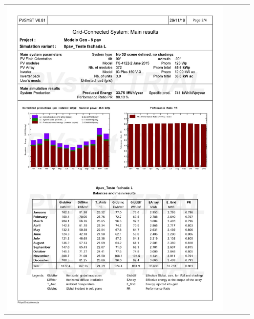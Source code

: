 \begin{table}[H]
    \centering
    \begin{tabular}{l}
        \includegraphics[width=0.9\textwidth]{figures/attachments/resultpv4.jpg}
    \end{tabular}
\end{table}
\pagebreak
